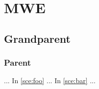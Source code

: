 \documentclass{scrbook}
\newcounter{scenario}
\begin{document}
\tableofcontents

\chapter{MWE}
	\section{Grandparent}
		\subsection{Parent}

\label{sce:foo}
\label{sce:bar}
...
In \autoref{sce:foo} ...
In \autoref{sce:bar} ...
\end{document}
